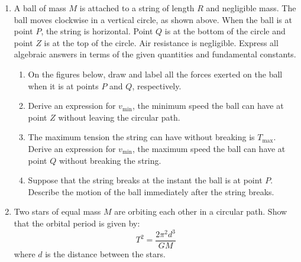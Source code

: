\documentclass{../../../oss-classkick}
\begin{document}
\begin{enumerate}[leftmargin=15pt]
\item A ball of mass $M$ is attached to a string of length $R$ and negligible
  mass. The ball moves clockwise in a vertical circle, as shown above. When the
  ball is at point $P$, the string is horizontal. Point $Q$ is at the bottom of
  the circle and point $Z$ is at the top of the circle. Air resistance is
  negligible. Express all algebraic answers in terms of the given quantities
  and fundamental constants.
  \begin{enumerate}[nosep]
  \item On the figures below, draw and label all the forces exerted on the ball
    when it is at points $P$ and $Q$, respectively.
    \begin{center}
      \hspace{1in}
    \end{center}
    \vspace{.3in}
  \item Derive an expression for $v_\mathrm{min}$, the minimum speed the ball
    can have at point $Z$ without leaving the circular path.
  \item The maximum tension the string can have without breaking is
    $T_\mathrm{max}$. Derive an expression for $v_\mathrm{min}$, the maximum
    speed the ball can have at point $Q$ without breaking the string.
  \item Suppose that the string breaks at the instant the ball is at point $P$.
    Describe the motion of the ball immediately after the string breaks.
  \end{enumerate}
  \newpage
  
\item Two stars of equal mass $M$ are orbiting each other in a circular path.
  Show that the orbital period is given by:
  \begin{displaymath}
    T^2=\frac{2\pi^2d^3}{GM}
  \end{displaymath}
  where $d$ is the distance between the stars.
  

\end{enumerate}
\end{document}
